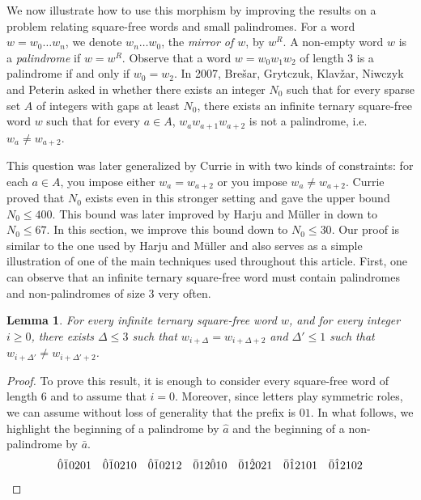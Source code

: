 \documentclass[12pt]{article}
\newtheorem{lemma}[theorem]{Lemma}
\theoremstyle{definition}
\begin{document}
We now illustrate how to use this morphism by improving the results on a problem relating square-free words and small palindromes.
For a word $w = w_0\dots w_n$, we denote $w_n\dots w_0$, the \emph{mirror of $w$}, by $w^R$. 
A non-empty word $w$ is a \emph{palindrome} if $w = w^R$. Observe that a word $w = w_0w_1w_2$ of length $3$ is a palindrome if and only if $w_0 = w_2$. 
In 2007, Brešar, Grytczuk, Klavžar, Niwczyk and Peterin asked in \cite{BRESAR_nonrepetitive_coloring_in_trees} whether there exists an integer $N_0$ such that for every sparse set $A$ of integers with gaps at least $N_0$, there exists an infinite ternary square-free word $w$ such that for every $a \in A$, $w_aw_{a + 1}w_{a + 2}$ is not a palindrome, i.e. $w_a \neq w_{a + 2}$. 

This question was later generalized by Currie in \cite{CURRIE_palindromes} with two kinds of constraints: for each $a \in A$, you impose either $w_a = w_{a + 2}$ or you impose $w_a \neq w_{a + 2}$. Currie proved that $N_0$ exists even in this stronger setting and gave the upper bound $N_0 \leq 400$. This bound was later improved by Harju and Müller in \cite{HARJU_palindromes} down to $N_0 \leq 67$. In this section, we improve this bound down to $N_0 \leq 30$. Our proof is similar to the one used by Harju and Müller and also serves as a simple illustration of one of the main techniques used throughout this article. First, one can observe that an infinite ternary square-free word must contain palindromes and non-palindromes of size $3$ very often.


\begin{lemma}\label{lemma:palindromes_recurrence}
    For every infinite ternary square-free word $w$, and for every integer $i \geq 0$, there exists $\Delta \leq 3$ such that $w_{i + \Delta} = w_{i + \Delta + 2}$ and $\Delta'\le1$ such that $w_{i + \Delta'} \neq w_{i + \Delta' + 2}$.
\end{lemma}

\begin{proof}
    To prove this result, it is enough to consider every square-free word of length $6$ and to assume that $i = 0$. Moreover, since letters play symmetric roles, we can assume without loss of generality that the prefix is $01$. In what follows, we highlight the beginning of a palindrome by $\hat{a}$ and the beginning of a non-palindrome by $\bar{a}$. 
    \[\hat0\bar10201\quad\hat0\bar10210\quad\hat0\bar10212\quad\bar012\hat010\quad\bar01\hat2021\quad\bar0\hat12101\quad\bar0\hat12102\qedhere\]
\end{proof}
\end{document}
